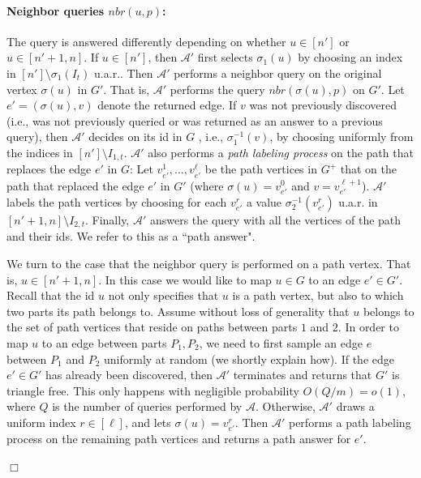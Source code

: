 \documentclass{article}
\newcommand{\calA}{{\mathcal{A}}}
\newcommand{\mA}{{\mathcal{A}}}
\newcommand{\trn}{{n'}}
\newcommand{\trG}{{G'}}
\newcommand{\trA}{{\calA'}}
\newcommand{\tre}{e'}
\newenvironment{proofof}[1]{\smallskip\noindent{\bf Proof of #1:}}%
        {\hspace*{\fill}$\Box$\par}
\newcommand{\commentt}[1]{ {}}
\begin{document}
\begin{proofof}{Theorem~\ref{thm:lb_ck_const_alpha}}

\paragraph{Neighbor queries $nbr(u,p)$:} 
The query is answered differently depending on whether $u\in [\trn]$ or $u\in [\trn+1,n]$.
If $u\in [\trn]$, then $\trA$ first selects $\sigma_1(u)$ by choosing an index in $[\trn]\setminus \sigma_1(I_t)$ u.a.r.. Then $\trA$ performs a neighbor query on the original vertex $\sigma(u)$ in $\trG$. That is, $\trA$ performs the query $nbr(\sigma(u), p)$ on $\trG$. 
    Let $\tre=(\sigma(u),v)$ denote the returned edge. 
    If $v$ was not previously discovered (i.e., was not previously queried or was returned as an answer to a previous query), then  
    $\trA$ decides on its id in $G$ , i.e., $\sigma^{-1}_1(v)$, by choosing uniformly from the indices in $[\trn]\setminus I_{1,t}$. 
    $\trA$ also performs a \emph{path labeling  process} on the path that replaces the edge $\tre$ in $G$:
    Let $v_{\tre}^1, \ldots, v_{\tre}^{\ell}$ be the path vertices in $G^+$ that 
    on the path that replaced the edge $\tre$ in $\trG$ (where $\sigma(u)=v_{\tre}^0$ and $v=v_{\tre}^{\ell+1}$).
    $\trA$  labels the path vertices  by choosing for each $v_{\tre}^r$ a value $\sigma_2^{-1}(v_{\tre}^r)$ u.a.r. in $[\trn+1, n]\setminus I_{2,t}$.
    Finally, $\trA$ answers the query with all the vertices of the path and their ids. %
    We refer to this as a ``path answer".

    We turn to the case that the neighbor query is performed on a path vertex. That is, $u\in [\trn+1, n]$.  
    In this case we would like to map $u\in G$ to an edge $\tre\in \trG$.  
    Recall that the id $u$ not only specifies that $u$ is a path vertex, but also to which two parts its path belongs to. Assume without loss of generality that $u$ belongs to the set of path vertices that reside on paths between parts $1$ and $2$. In order to map $u$ to an edge between parts $P_1,P_2$, we need to first sample an edge $e$ between $P_1$ and $P_2$ uniformly at random  (we shortly explain how).  If the edge $\tre\in \trG$ has already been  discovered, then $\trA$ terminates and returns that $\trG$ is triangle free. This only happens with negligible probability $O(Q/m)=o(1)$, where $Q$ is the number of queries performed by $\mA$. Otherwise, $\trA$  draws   a uniform index $r\in [\ell]$,  
  and lets $\sigma(u)=v_{\tre}^{r}$. Then 
    $\trA$ performs a path labeling process on the remaining path vertices and returns a path answer for $\tre$.
    

\end{proofof}
\end{document}
